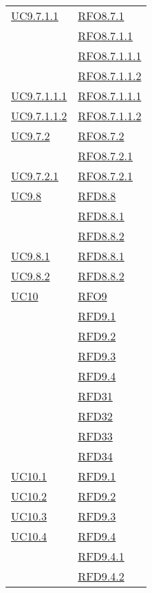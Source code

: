 \begin{longtable}{|>{\centering}m{5cm}|m{5cm}<{\centering}|}
\hyperref[UC9.7.1.1]{UC9.7.1.1} & \hyperlink{RFO8.7.1}{RFO8.7.1}\\
& \hyperlink{RFO8.7.1.1}{RFO8.7.1.1}\\
& \hyperlink{RFO8.7.1.1.1}{RFO8.7.1.1.1}\\
& \hyperlink{RFO8.7.1.1.2}{RFO8.7.1.1.2}\\ \hline
\hyperref[UC9.7.1.1.1]{UC9.7.1.1.1} & \hyperlink{RFO8.7.1.1.1}{RFO8.7.1.1.1}\\ \hline
\hyperref[UC9.7.1.1.2]{UC9.7.1.1.2} & \hyperlink{RFO8.7.1.1.2}{RFO8.7.1.1.2}\\ \hline
\hyperref[UC9.7.2]{UC9.7.2} & \hyperlink{RFO8.7.2}{RFO8.7.2}\\
& \hyperlink{RFO8.7.2.1}{RFO8.7.2.1}\\ \hline
\hyperref[UC9.7.2.1]{UC9.7.2.1} & \hyperlink{RFO8.7.2.1}{RFO8.7.2.1}\\ \hline
\hyperref[UC9.8]{UC9.8} & \hyperlink{RFD8.8}{RFD8.8}\\
& \hyperlink{RFD8.8.1}{RFD8.8.1}\\
& \hyperlink{RFD8.8.2}{RFD8.8.2}\\ \hline
\hyperref[UC9.8.1]{UC9.8.1} & \hyperlink{RFD8.8.1}{RFD8.8.1}\\ \hline
\hyperref[UC9.8.2]{UC9.8.2} & \hyperlink{RFD8.8.2}{RFD8.8.2}\\ \hline
\hyperref[UC10]{UC10} & \hyperlink{RFO9}{RFO9}\\
& \hyperlink{RFD9.1}{RFD9.1}\\
& \hyperlink{RFD9.2}{RFD9.2}\\
& \hyperlink{RFD9.3}{RFD9.3}\\
& \hyperlink{RFD9.4}{RFD9.4}\\
& \hyperlink{RFD31}{RFD31}\\
& \hyperlink{RFD32}{RFD32}\\
& \hyperlink{RFD33}{RFD33}\\
& \hyperlink{RFD34}{RFD34}\\ \hline
\hyperref[UC10.1]{UC10.1} & \hyperlink{RFD9.1}{RFD9.1}\\ \hline
\hyperref[UC10.2]{UC10.2} & \hyperlink{RFD9.2}{RFD9.2}\\ \hline
\hyperref[UC10.3]{UC10.3} & \hyperlink{RFD9.3}{RFD9.3}\\ \hline
\hyperref[UC10.4]{UC10.4} & \hyperlink{RFD9.4}{RFD9.4}\\
& \hyperlink{RFD9.4.1}{RFD9.4.1}\\
& \hyperlink{RFD9.4.2}{RFD9.4.2}\\

\end{longtable}
